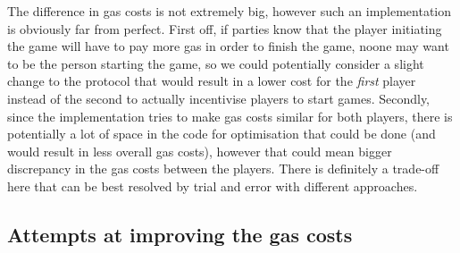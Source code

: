 \documentclass{article}
\begin{document}
    \noindent The difference in gas costs is not extremely
    big, however such an implementation is obviously far
    from perfect. First off, if parties know that the player
    initiating the game will have to pay more gas in order
    to finish the game, noone may want to be the person
    starting the game, so we could potentially consider a
    slight change to the protocol that would result in a
    lower cost for the {\itshape first} player instead of
    the second to actually incentivise players to start
    games. Secondly, since the implementation tries to make
    gas costs similar for both players, there is potentially
    a lot of space in the code for optimisation that could
    be done (and would result in less overall gas costs),
    however that could mean bigger discrepancy in the gas
    costs between the players. There is definitely a
    trade-off here that can be best resolved by trial and
    error with different approaches.
    
    \subsection{Attempts at improving the gas costs}
\end{document}
